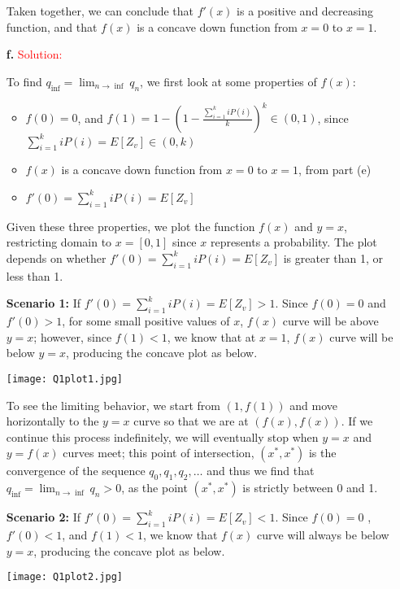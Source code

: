 \documentclass[11pt]{article} %
\begin{document}
\begin{itemize}
Taken together, we can conclude that $f'(x)$ is a positive and decreasing function, and that $f(x)$ is a concave down function from $x=0$ to $x=1$.


        \item[\textbf{f.}]  
\textcolor{red}{Solution:}

To find $q_{\inf}=\lim_{n \to \inf} q_n$, we first look at some properties of $f(x)$:
\begin{itemize}
	\item $f(0)=0$, and $f(1)=1-(1-\frac{\sum_{i=1}^{k} i P(i)}{k})^k \in (0,1)$, since $\sum_{i=1}^{k} i P(i)=E[Z_v] \in (0, k) $
	\item $f(x)$ is a concave down function from $x=0$ to $x=1$, from part (e)
	\item $f'(0)=\sum_{i=1}^{k} i P(i) =E[Z_v]$
\end{itemize}

Given these three properties, we plot the function $f(x)$ and $y=x$, restricting domain to $x=[0,1]$ since $x$ represents a probability. The plot depends on whether $f'(0)=\sum_{i=1}^{k} i P(i)  =E[Z_v]$ is greater than 1, or less than 1. 

\textbf{Scenario 1:} If $f'(0)=\sum_{i=1}^{k} i P(i)  =E[Z_v]>1$. 
Since $f(0)=0$ and $f'(0)>1$, for some small positive values of $x$, $f(x)$ curve will be above $y=x$; however, since $f(1)<1$, we know that at $x=1$, $f(x)$ curve will be below $y=x$, producing the concave plot as below.

\begin{center}
\texttt{[image: Q1plot1.jpg]}
\end{center}

To see the limiting behavior, we start from $(1, f(1))$ and move horizontally to the $y=x$ curve so that we are at $(f(x),f(x))$. If we continue this process indefinitely, we will eventually stop when $y=x$ and $y=f(x)$ curves meet; this point of intersection, $(x^*, x^*)$ is the convergence of the sequence $q_0, q_1, q_2, \dots$ and thus we find that $q_{\inf}=\lim_{n \to \inf} q_n >0$, as the point $(x^*, x^*)$ is strictly between 0 and 1. 


\textbf{Scenario 2:} If $f'(0)=\sum_{i=1}^{k} i P(i)  =E[Z_v]<1$. 
Since $f(0)=0$ , $f'(0)<1$, and $f(1)<1$, we know that $f(x)$ curve will always be below $y=x$, producing the concave plot as below.

\begin{center}
\texttt{[image: Q1plot2.jpg]}
\end{center}


\end{itemize}
\end{document}
